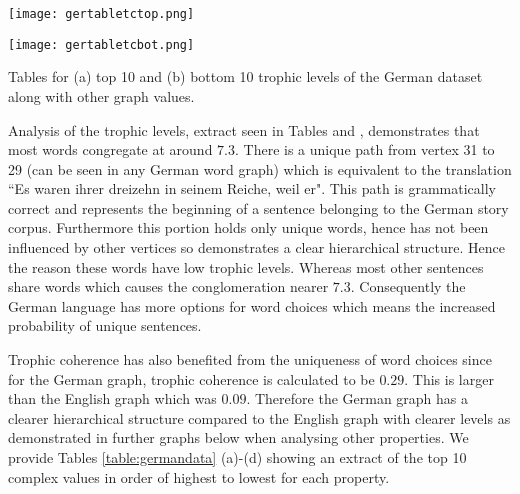 \begin{table}[!htb]
\centering
\begin{subtable}{.45\textwidth}
	\centering
	\texttt{[image: gertabletctop.png]}
	\caption{}
	\label{table:germantoptc}
\end{subtable}
\hfill
\begin{subtable}{.45\textwidth}
	\centering
	\texttt{[image: gertabletcbot.png]}
	\caption{}
	\label{table:germanbottc}
\end{subtable}
\caption{Tables for (a) top 10 and (b) bottom 10 trophic levels of the German dataset along with other graph values.}
\end{table}

Analysis of the trophic levels, extract seen in Tables \label{table:germantoptc} and \label{table:germanbottc}, demonstrates that most words congregate at around $7.3$. There is a unique path from vertex 31 to 29 (can be seen in any German word graph) which is equivalent to the translation ``Es waren ihrer dreizehn in seinem Reiche, weil er". This path is grammatically correct and represents the beginning of a sentence belonging to the German story corpus. Furthermore this portion holds only unique words, hence has not been influenced by other vertices so demonstrates a clear hierarchical structure. Hence the reason these words have low trophic levels. Whereas most other sentences share words which causes the conglomeration nearer $7.3$. Consequently the German language has more options for word choices which means the increased probability of unique sentences.

Trophic coherence has also benefited from the uniqueness of word choices since for the German graph, trophic coherence is calculated to be $0.29$. This is larger than the English graph which was $0.09$. Therefore the German graph has a clearer hierarchical structure compared to the English graph with clearer levels as demonstrated in further graphs below when analysing other properties. We provide Tables \ref{table:germandata} (a)-(d) showing an extract of the top 10 complex values in order of highest to lowest for each property.

